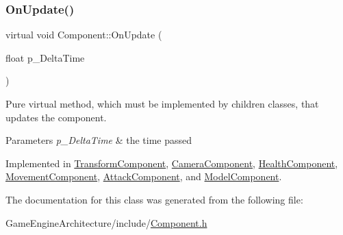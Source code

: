 \subsubsection{\texorpdfstring{OnUpdate()}{OnUpdate()}}
{\footnotesize\ttfamily virtual void Component\+::\+On\+Update (\begin{DoxyParamCaption}\item[{float}]{p\+\_\+\+Delta\+Time }\end{DoxyParamCaption})\hspace{0.3cm}{\ttfamily [pure virtual]}}



Pure virtual method, which must be implemented by children classes, that updates the component. 


\begin{DoxyParams}{Parameters}
{\em p\+\_\+\+Delta\+Time} & the time passed \\
\hline
\end{DoxyParams}


Implemented in \mbox{\hyperlink{class_transform_component_a4e84c8415bc74787d8392182de9c15df}{Transform\+Component}}, \mbox{\hyperlink{class_camera_component_a8fd406e84c5c31bcdbf0ff482c76b173}{Camera\+Component}}, \mbox{\hyperlink{class_health_component_a525bed56c917ce36bbfb67264350e56a}{Health\+Component}}, \mbox{\hyperlink{class_movement_component_aa7d58780fe672dc910896c53aa4da7fd}{Movement\+Component}}, \mbox{\hyperlink{class_attack_component_a92aca094d9d41cddca1a730e672cb835}{Attack\+Component}}, and \mbox{\hyperlink{class_model_component_a52333e35346182468a0bfe0311c900e0}{Model\+Component}}.



The documentation for this class was generated from the following file\+:\begin{DoxyCompactItemize}
\item 
Game\+Engine\+Architecture/include/\mbox{\hyperlink{_component_8h}{Component.\+h}}\end{DoxyCompactItemize}
